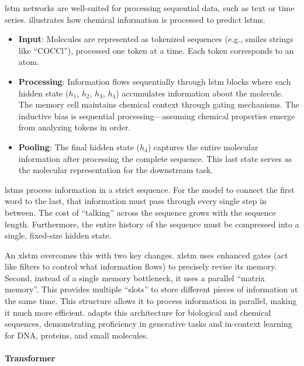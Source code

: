 \gls{lstm} networks \autocite{hochreiter1997long} are well-suited for processing sequential data, such as text or time series. 
 illustrates how chemical information is processed to predict \glspl{lstm}.
\begin{itemize}
    \item \textbf{Input}: Molecules are represented as tokenized sequences (e.g., \gls{smiles} strings like \enquote{COCCl}), processed one token at a time. Each token corresponds to an atom.
    \item \textbf{Processing}: Information flows sequentially through \gls{lstm} blocks where each hidden state ($h_{1}$, $h_{2}$, $h_{3}$, $h_{4}$) accumulates information about the molecule. The memory cell maintains chemical context through gating mechanisms. The inductive bias is sequential processing---assuming chemical properties emerge from analyzing tokens in order.
    \item \textbf{Pooling}: The final hidden state ($h_{4}$) captures the entire molecular information after processing the complete sequence. This last state serves as the molecular representation for the downstream task.
\end{itemize}

\glspl{lstm} process information in a strict sequence.  For the model to connect the first word to the last, that information must pass through every single step in between. The cost of \enquote{talking} across the sequence grows with the sequence length. 
Furthermore, the entire history of the sequence must be compressed into a single, fixed-size hidden state.

An \gls{xlstm} overcomes this with two key changes. \gls{xlstm} uses enhanced gates (act like filters to control what information flows) to precisely revise its memory. Second, instead of a single memory bottleneck, it uses a parallel \enquote{matrix memory}. This provides multiple \enquote{slots} to store different pieces of information at the same time. This structure allows it to process information in parallel, making it much more efficient.
 adapts this architecture for biological and chemical sequences, demonstrating proficiency in generative tasks and in-context learning for DNA, proteins, and small molecules.\autocite{SchmidingerSSSH25}


\paragraph{Transformer}

